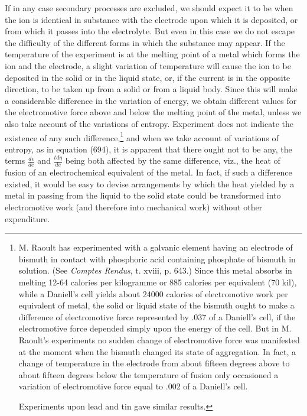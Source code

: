 \documentclass[12pt]{article}
\begin{document}
If in any case secondary processes are excluded, we should expect it to be when the ion is identical in substance with the electrode upon which it is deposited, or from which it passes into the electrolyte. But even in this case we do not escape the difficulty of the different forms in which the substance may appear. If the temperature of the experiment is at the melting point of a metal which forms the ion and the electrode, a slight variation of temperature will cause the ion to be deposited in the solid or in the liquid state, or, if the current is in the opposite direction, to be taken up from a solid or from a liquid body. Since this will make a considerable difference in the variation of energy, we obtain different values for the electromotive force above and below the melting point of the metal, unless we also take account of the variations of entropy. Experiment does not indicate the existence of any such difference,\footnote{M. Raoult has experimented with a galvanic element having an electrode of bismuth in contact with phosphoric acid containing phosphate of bismuth in solution. (See \textit{Comptes Rendus}, t. xviii, p. 643.) Since this metal absorbs in melting 12-64 calories per kilogramme or 885 calories per equivalent (70 kil), while a Daniell's cell yields about 24000 calories of electromotive work per equivalent of metal, the solid or liquid state of the bismuth ought to make a difference of electromotive force represented by .037 of a Daniell's cell, if the electromotive force depended simply upon the energy of the cell. But in M. Raoult's experiments no sudden change of electromotive force was manifested at the moment when the bismuth changed its state of aggregation. In fact, a change of temperature in the electrode from about fifteen degrees above to about fifteen degrees below the temperature of fusion only occasioned a variation of electromotive force equal to .002 of a Daniell's cell. \par
Experiments upon lead and tin gave similar results.} and when we take account of variations of entropy, as in equation (694), it is apparent that there ought not to be any, the terms $\frac{d\epsilon}{de}$ and $\frac{td\eta}{de}$ being both affected by the same difference, viz., the heat of fusion of an electrochemical equivalent of the metal. In fact, if such a difference existed, it would be easy to devise arrangements by which the heat yielded by a metal in passing from the liquid to the solid state could be transformed into electromotive work (and therefore into mechanical work) without other expenditure.
\end{document}
